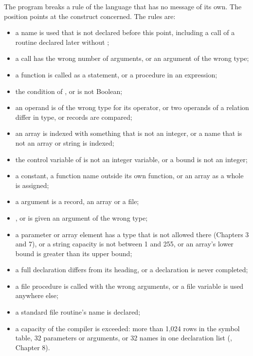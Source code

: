 The program breaks a rule of the language that has no message of its own.
The position points at the construct concerned.  The rules are:
\begin{itemize}
\item a name is used that is not declared before this point, including a
  call of a routine declared later without ;
\item a call has the wrong number of arguments, or an argument of the wrong
  type;
\item a function is called as a statement, or a procedure in an expression;
\item the condition of ,  or  is not Boolean;
\item an operand is of the wrong type for its operator, or two operands of a
  relation differ in type, or records are compared;
\item an array is indexed with something that is not an integer, or a name
  that is not an array or string is indexed;
\item the control variable of  is not an integer variable, or a
  bound is not an integer;
\item a constant, a function name outside its own function, or an array as
  a whole is assigned;
\item a  argument is a record, an array or a file;
\item {},  or  is given an
  argument of the wrong type;
\item a parameter or array element has a type that is not allowed there
  (Chapters 3 and 7), or a string capacity is not between 1 and 255, or an
  array's lower bound is greater than its upper bound;
\item a full declaration differs from its  heading, or a
   declaration is never completed;
\item a file procedure is called with the wrong arguments, or a file
  variable is used anywhere else;
\item a standard file routine's name is declared;
\item a capacity of the compiler is exceeded: more than 1,024 rows in the
  symbol table, 32 parameters or arguments, or 32 names in one declaration
  list (, Chapter 8).
\end{itemize}


